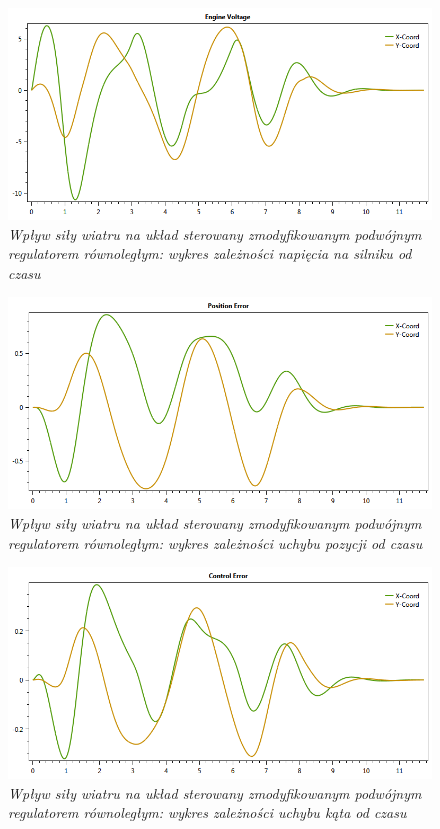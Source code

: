 \documentclass[12pt, oneside]{report}
\theoremstyle{definition}
\begin{document}
\begin{figure}[H]
	\centering
		\includegraphics[width = 350pt]{WindPDEV} 
		\caption{\textit{Wpływ siły wiatru na układ sterowany zmodyfikowanym podwójnym regulatorem równoległym: wykres zależności napięcia na silniku od czasu}}
		\label{plot:WindPDEV}
\end{figure}

\begin{figure}[H]
	\centering
		\includegraphics[width = 350pt]{WindPDCEP} 
		\caption{\textit{Wpływ siły wiatru na układ sterowany zmodyfikowanym podwójnym regulatorem równoległym: wykres zależności uchybu pozycji od czasu}}
		\label{plot:WindPDCEP}
\end{figure}

\begin{figure}[H]
	\centering
		\includegraphics[width = 350pt]{WindPDCEA} 
		\caption{\textit{Wpływ siły wiatru na układ sterowany zmodyfikowanym podwójnym regulatorem równoległym: wykres zależności uchybu kąta od czasu}}
		\label{plot:WindPDCEA}
\end{figure}
\end{document}
